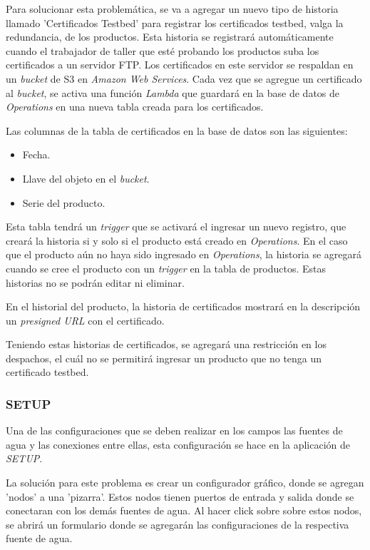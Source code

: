 Para solucionar esta problemática, se va a agregar un nuevo tipo de historia llamado 'Certificados Testbed' para registrar los certificados testbed, valga la redundancia, de los productos.
Esta historia se registrará automáticamente cuando el trabajador de taller que esté probando los productos suba los certificados a un servidor FTP. Los certificados en este servidor se respaldan en un \textit{bucket} de S3 en \textit{Amazon Web Services}.
Cada vez que se agregue un certificado al \textit{bucket}, se activa una función \textit{Lambda} que guardará en la base de datos de \textit{Operations} en una nueva tabla creada para los certificados.

Las columnas de la tabla de certificados en la base de datos son las siguientes: 
\begin{itemize}
    \item Fecha.
    \item Llave del objeto en el \textit{bucket}.
    \item Serie del producto.
\end{itemize}
Esta tabla tendrá un \textit{trigger} que se activará el ingresar un nuevo registro, que creará la historia si y solo si el producto está creado en \textit{Operations}.
En el caso que el producto aún no haya sido ingresado en \textit{Operations}, la historia se agregará cuando se cree el producto con un \textit{trigger} en la tabla de productos.
Estas historias no se podrán editar ni eliminar.

En el historial del producto, la historia de certificados mostrará en la descripción un \textit{presigned URL} con el certificado.

Teniendo estas historias de certificados, se agregará una restricción en los despachos, el cuál no se permitirá ingresar un producto que no tenga un certificado testbed.
\fi

\subsubsection{SETUP}


Una de las configuraciones que se deben realizar en los campos las fuentes de agua y las conexiones entre ellas, esta configuración se hace en la aplicación de \textit{SETUP}.

La solución para este problema es crear un configurador gráfico, donde se agregan 'nodos' a una 'pizarra'. Estos nodos tienen puertos de entrada y salida donde se conectaran con los demás fuentes de agua. Al hacer click sobre sobre estos nodos, se abrirá un formulario donde se agregarán las configuraciones de la respectiva fuente de agua.

